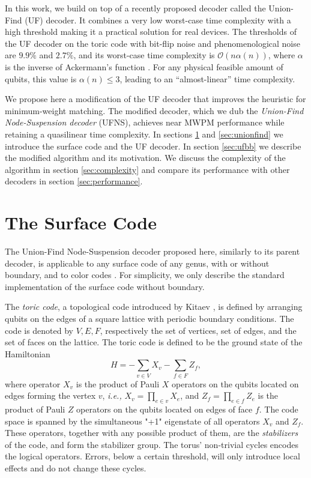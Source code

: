 In this work, we build on top of a recently proposed decoder called the Union-Find (UF) decoder. It combines a very low worst-case time complexity with a high threshold \cites{delfosse2017almost} making it a practical solution for real devices. The thresholds of the UF decoder on the toric code with bit-flip noise and phenomenological noise are $9.9\%$ and $2.7\%$, and its worst-case time complexity is $\mathcal{O}(n\alpha(n))$, where $\alpha$ is the inverse of Ackermann's function \cite{tarjan1975efficiency}. For any physical feasible amount of qubits, this value is $\alpha(n) \leq 3$, leading to an ``almost-linear'' time complexity.

We propose here a modification of the UF decoder that improves the heuristic for minimum-weight matching. The modified decoder, which we dub the \emph{Union-Find Node-Suspension decoder} (UFNS), achieves near MWPM performance while retaining a quasilinear time complexity. In sections \ref{sec:surfacecode} and \ref{sec:unionfind} we introduce the surface code and the UF decoder. In section \ref{sec:ufbb} we describe the modified algorithm and its motivation. We discuss the complexity of the algorithm in section \ref{sec:complexity} and compare its performance with other decoders in section \ref{sec:performance}.  

\section{The Surface Code}\label{sec:surfacecode}

The Union-Find Node-Suspension decoder proposed here, similarly to its parent decoder, is applicable to any surface code of any genus, with or without boundary, and to color codes \cite{delfosse2017almost}. For simplicity, we only describe the standard implementation of the surface code without boundary.

The \emph{toric code}, a topological code introduced by Kitaev \cite{kitaev2003fault}, is defined by arranging qubits on the edges of a square lattice with periodic boundary conditions. The code is denoted by $V,E,F$, respectively the set of vertices, set of edges, and the set of faces on the lattice. The toric code is defined to be the ground state of the Hamiltonian 
\begin{equation}
    H = -\sum_{v \in V} X_v -\sum_{f \in F} Z_f, 
\end{equation}
where operator $X_v$ is the product of Pauli $X$ operators on the qubits located on edges forming the vertex $v$, \emph{i.e.,} $X_v = \prod_{e \in v} X_e$, and $Z_f = \prod_{e \in f} Z_e$ is the product of Pauli $Z$ operators on the qubits located on edges of face $f$. The code space is spanned by the simultaneous "+1" eigenstate of all operators $X_v$ and $Z_f$. These operators, together with any possible product of them, are the \emph{stabilizers} of the code, and form the stabilizer group. The torus' non-trivial cycles encodes the logical operators. Errors, below a certain threshold, will only introduce local effects and do not change these cycles.

